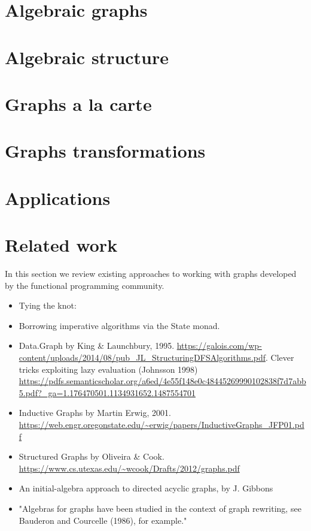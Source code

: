 \documentclass[acmlarge,anonymous]{acmart}\settopmatter{printfolios=true}
\begin{document}
\section{Algebraic graphs}\label{sec-class}

\section{Algebraic structure}\label{sec-algebra}

\section{Graphs a la carte}\label{sec-a-la-carte}

\section{Graphs transformations}\label{sec-transformations}

\section{Applications}\label{sec-applications}

\section{Related work}\label{sec-related}

In this section we review existing approaches to working with graphs developed
by the functional programming community.

\begin{itemize}
    \item Tying the knot:
    \item Borrowing imperative algorithms via the State monad.
    \item Data.Graph by King & Launchbury, 1995. \url{https://galois.com/wp-content/uploads/2014/08/pub_JL_StructuringDFSAlgorithms.pdf}.
    Clever tricks exploiting lazy evaluation (Johnsson 1998) \url{https://pdfs.semanticscholar.org/a6ed/4e55f148e0c48445269990102838f7d7abb5.pdf?_ga=1.176470501.1134931652.1487554701}

    \item Inductive Graphs by Martin Erwig, 2001. \url{https://web.engr.oregonstate.edu/~erwig/papers/InductiveGraphs_JFP01.pdf}
    \item Structured Graphs by Oliveira & Cook. \url{https://www.cs.utexas.edu/~wcook/Drafts/2012/graphs.pdf}
    \item An initial-algebra approach to directed acyclic graphs, by J. Gibbons
    \item "Algebras for graphs have been studied in the context of graph rewriting, see Bauderon and Courcelle (1986), for example."
\end{itemize}
\end{document}
